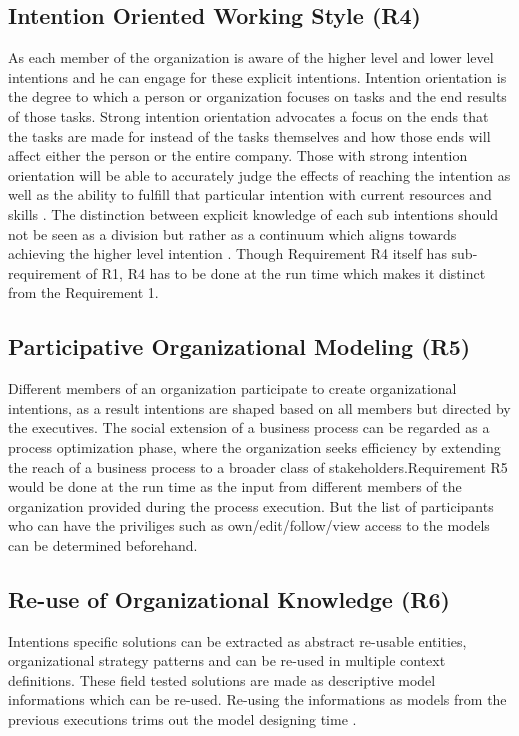 \subsection{Intention Oriented Working Style (R4)}
As each member of the organization is aware of the higher level and lower level intentions and he can engage for these explicit intentions. Intention orientation is the degree to which a person or organization focuses on tasks and the end results of those tasks. Strong intention orientation advocates a focus on the ends that the tasks are made for instead of the tasks themselves and how those ends will affect either the person or the entire company. Those with strong intention orientation will be able to accurately judge the effects of reaching the intention as well as the ability to fulfill that particular intention with current resources and skills \cite{Lacom}. The distinction between explicit knowledge of each sub intentions should not be seen as a division but rather as a continuum which aligns towards achieving the higher level intention . Though Requirement R4 itself has sub-requirement of R1, R4 has to be done at the run time which makes it distinct from the Requirement 1.

\subsection{Participative Organizational Modeling (R5)}
 Different members of an organization participate to create organizational intentions, as a result intentions are shaped based on all members but directed by the executives. The  social  extension  of  a  business  process  can  be  regarded  as  a  process optimization phase, where the organization seeks efficiency  by  extending  the  reach  of  a  business  process  to  a  broader  class  of  stakeholders\cite{Brambilla2012}.Requirement R5 would be done at the run time as the input from different members of the organization provided during the process execution. But the list of participants who can have the priviliges such as own/edit/follow/view access to the models can be determined beforehand.
 
 \subsection{Re-use of Organizational Knowledge (R6)}
 Intentions specific solutions can be extracted as abstract re-usable entities, organizational strategy patterns and can be re-used in multiple context definitions. These field tested solutions are made as descriptive model informations which can be re-used.  Re-using the informations as models from the previous executions trims out the model designing time \cite{Yu2000}.

